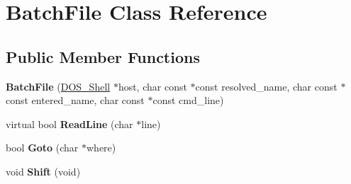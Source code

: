 \hypertarget{classBatchFile}{\section{Batch\-File Class Reference}
\label{classBatchFile}
}
\subsection*{Public Member Functions}
\begin{DoxyCompactItemize}
\item 
\hypertarget{classBatchFile_a775abb3eea26411ba33361cc2cc24a5e}{{\bfseries Batch\-File} (\hyperlink{classDOS__Shell}{D\-O\-S\-\_\-\-Shell} $\ast$host, char const $\ast$const resolved\-\_\-name, char const $\ast$const entered\-\_\-name, char const $\ast$const cmd\-\_\-line)}\label{classBatchFile_a775abb3eea26411ba33361cc2cc24a5e}

\item 
\hypertarget{classBatchFile_a98c2f9b094afb00bcf51230e084db13b}{virtual bool {\bfseries Read\-Line} (char $\ast$line)}\label{classBatchFile_a98c2f9b094afb00bcf51230e084db13b}

\item 
\hypertarget{classBatchFile_ad0c27c1a7b4a3d48f0b7a456efaeda43}{bool {\bfseries Goto} (char $\ast$where)}\label{classBatchFile_ad0c27c1a7b4a3d48f0b7a456efaeda43}

\item 
\hypertarget{classBatchFile_a41d411d2ace578a96093aefcac40f8d3}{void {\bfseries Shift} (void)}\label{classBatchFile_a41d411d2ace578a96093aefcac40f8d3}

\end{DoxyCompactItemize}
